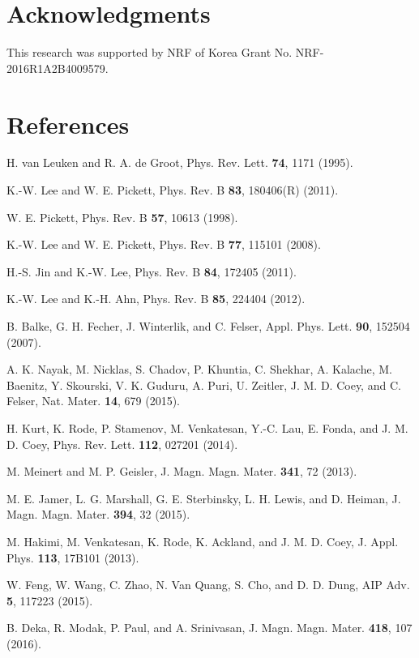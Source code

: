 \documentclass[preprint,5p]{elsarticle}
\begin{document}
\section{Acknowledgments}
 This research was supported by NRF of Korea Grant No. NRF-2016R1A2B4009579.


\section{References}
\begin{thebibliography}{10}
 H. van Leuken and R. A. de Groot,
 Phys. Rev. Lett. {\bf 74}, 1171 (1995).

 K.-W. Lee and W. E. Pickett,
 Phys. Rev. B {\bf 83}, 180406(R) (2011).

 W. E. Pickett,
 Phys. Rev. B {\bf 57}, 10613 (1998).

 K.-W. Lee and W. E. Pickett,
  Phys. Rev. B {\bf 77}, 115101 (2008).

 H.-S. Jin and K.-W. Lee, 
 Phys. Rev. B {\bf 84}, 172405 (2011).

 K.-W. Lee and K.-H. Ahn,
 Phys. Rev. B {\bf 85}, 224404 (2012).


 B. Balke, G. H. Fecher, J. Winterlik, and C. Felser,
 Appl. Phys. Lett. {\bf 90}, 152504 (2007).
 

 A. K. Nayak, M. Nicklas, S. Chadov, P. Khuntia, C. Shekhar,
  A. Kalache, M. Baenitz, Y. Skourski, V. K. Guduru, A. Puri, U. Zeitler, J. M. D. Coey, and C. Felser,
 Nat. Mater.  {\bf 14}, 679 (2015).

 H. Kurt, K. Rode, P. Stamenov, M. Venkatesan, Y.-C. Lau, E. Fonda, and J. M. D. Coey,
 Phys. Rev. Lett. {\bf 112}, 027201 (2014).


 M. Meinert and M. P. Geisler, 
 J. Magn. Magn. Mater. {\bf 341}, 72 (2013).

 M. E. Jamer, L. G. Marshall, G. E. Sterbinsky, L. H. Lewis, and D. Heiman, 
 J. Magn. Magn. Mater. {\bf 394}, 32 (2015).

 M. Hakimi, M. Venkatesan, K. Rode, K. Ackland, and J. M. D. Coey, 
 J. Appl. Phys. {\bf 113}, 17B101 (2013).

 W. Feng, W. Wang, C. Zhao, N. Van Quang, S. Cho, and D. D. Dung, 
 AIP Adv. {\bf 5}, 117223 (2015).

 B. Deka, R. Modak, P. Paul, and A. Srinivasan,
 J. Magn. Magn. Mater. {\bf 418}, 107 (2016).


\end{thebibliography}
\end{document}
